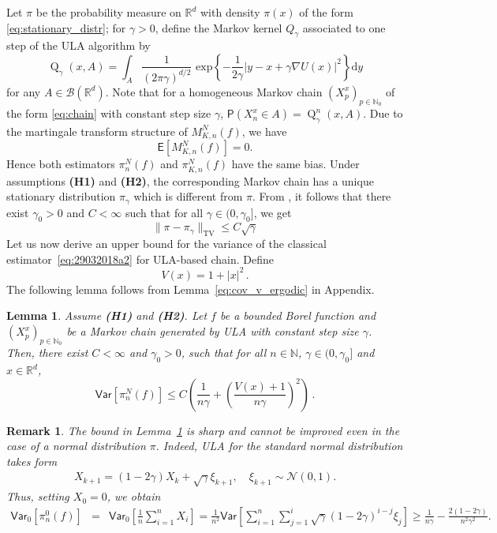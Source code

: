 \documentclass[bj]{imsart}
\def\PVar{\mathsf{Var}}
\def\nset{\mathbb{N}}
\def\rset{\mathbb{R}}
\def\rmd{\mathrm{d}}
\def\rset{\mathbb{R}}
\newtheorem{lem}[thm]{Lemma}
\newtheorem{remark}[thm]{Remark}
\newcommand{\tvnorm}[1]{\| #1 \|_{\operatorname{TV}}}
\def\kerULA{\operatorname{Q}}
\def\eqsp{\,}
\begin{document}
Let $\pi$ be the probability measure on $\rset^d$ with density $\pi(x)$ of the form \eqref{eq:stationary_distr};
for $\gamma>0$, define the Markov kernel $Q_\gamma$ associated to one step of the ULA algorithm by
\begin{equation}
\label{eq:ula_kernel}
\kerULA_{\gamma}(x,A)=\int_{A} \frac{1}{(2 \pi \gamma)^{d/2}} \text{ exp} \left\{ -\frac{1}{2\gamma} | y - x + \gamma \nabla U(x)|^2\right\} \rmd y
\end{equation}
for any $A \in \mathcal{B}(\rset^d)$. Note that for a homogeneous Markov chain $\left(X^x_{p}\right)_{p \in \nset_0}$ of the form \eqref{eq:chain} with constant step size $\gamma$, $\mathsf{P}(X_n^x \in A) = \kerULA^n_{\gamma}(x,A)$.
Due to the martingale transform structure
of $M_{K,n}^N(f)$,
we have
\[
\mathsf E\left[M_{K,n}^N(f)\right]=0.
\]
Hence both estimators
$\pi_n^N(f)$ and $\pi_{K,n}^N(f)$ have the same  bias. Under assumptions {\bf (H1)} and {\bf (H2)}, the corresponding Markov chain has a unique stationary distribution $\pi_\gamma$ which is different from $\pi$. From \cite[Theorem~10]{durmus:moulines:2017},
it follows that there exist $\gamma_0 > 0$ and $C < \infty$ such that for all $\gamma \in (0,\gamma_0]$, we get
\begin{equation}
\label{eq:bias_2}
\tvnorm{\pi - \pi_\gamma} \leq  C\sqrt{\gamma}
\end{equation}
 Let us now derive an upper bound for the variance of the classical estimator~\eqref{eq:29032018a2} for ULA-based chain. Define
 \begin{equation}
 \label{eq:definition-V}
 V(x) = 1+ |x|^2 \,.
 \end{equation}
 The following lemma follows from Lemma~\ref{eq:cov_v_ergodic} in Appendix.
\begin{lem}
\label{lem:variance}
Assume {\bf (H1)} and {\bf (H2)}.
Let $f$ be a bounded Borel function and $(X^x_{p})_{p \in \nset_0}$ be a Markov chain generated by ULA with constant step size $\gamma$. Then, there exist $C < \infty$ and $\gamma_0 > 0$, such that for all $n \in \nset$, $\gamma \in (0,\gamma_0]$ and $x \in \rset^d$,
\begin{equation}
\label{eq:var-mc}
\PVar\left[\pi_n^N(f)\right]\leq C\left(\frac{1}{n\gamma} + \left(\frac{V(x)+1}{n\gamma}\right)^2\right) \eqsp.
\end{equation}
\end{lem}
\begin{remark}
\label{rem:var-low}
The bound in Lemma~\ref{lem:variance} is sharp and cannot be improved even in the case of a normal distribution $\pi.$
Indeed,  ULA for the standard normal distribution takes form
\begin{eqnarray*}
X_{k+1} = (1-2\gamma)X_k + \sqrt{\gamma}\xi_{k+1},\quad \xi_{k+1} \sim \mathcal{N}(0,1).
\end{eqnarray*}
Thus, setting $X_0 = 0$, we obtain
\begin{eqnarray*}
\PVar_{0} [\pi_n^0(f)] &=& \PVar_{0}\left[\frac{1}{n}\sum\limits_{i=1}^{n}X_i\right]
= \frac{1}{n^2}\PVar\left[\sum\limits_{i=1}^{n}\sum\limits_{j=1}^{i}\sqrt{\gamma}(1-2\gamma)^{i-j}\xi_{j}\right]
\geq  \frac{1}{n\gamma} - \frac{2(1-2\gamma)}{n^2\gamma^2}.
\end{eqnarray*}
\end{remark}
\end{document}
